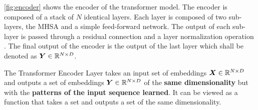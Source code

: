 \documentclass[../../main.tex]{subfiles}
\begin{document}
\autoref{fig:encoder} shows the encoder of the transformer model. The encoder is composed of a stack of $N$ identical layers. Each layer is composed of two sub-layers, the MHSA and a simple feed-forward network. The output of each sub-layer is passed through a residual connection and a layer normalization operation \parencite{ba2016layer}. The final output of the encoder is the output of the last layer which shall be denoted as $\bm{Y} \in \mathbb{R}^{N \times D}$. 

\begin{note}

The Transformer Encoder Layer takes an input set of embeddings $\bm{X} \in \mathbb{R}^{N \times D}$ and outputs a set of embeddings $\bm{Y} \in \mathbb{R}^{N \times D}$ of the \textbf{same dimensionality} but with the \textbf{patterns of the input sequence learned}. It can be viewed as a function that takes a set and outputs a set of the same dimensionality.

\end{note}

\ifSubfilesClassLoaded{%
    \printbibliography{}
}{} 
\end{document}
